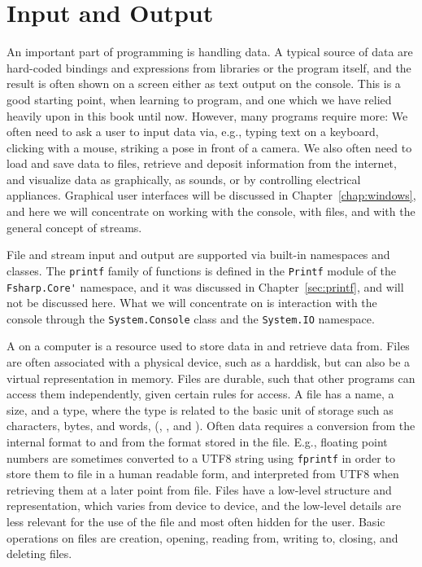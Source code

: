 \chapter{Input and Output}
\label{chap:IO}
An important part of programming is handling data. A typical source of data are hard-coded bindings and expressions from libraries or the program itself, and the result is often shown on a screen either as text output on the console. This is a good starting point, when learning to program, and one which we have relied heavily upon in this book until now. However, many programs require more: We often need to ask a user to input data via, e.g., typing text on a keyboard, clicking with a mouse, striking a pose in front of a camera. We also often need to load and save data to files, retrieve and deposit information from the internet, and visualize data as graphically, as sounds, or by controlling electrical appliances. Graphical user interfaces will be discussed in Chapter~\ref{chap:windows}, and here we will concentrate on working with the console, with files, and with the general concept of streams. 

File and stream input and output are supported via built-in namespaces and classes. The \lstinline!printf! family of functions is defined in the \lstinline!Printf! module of the \lstinline!Fsharp.Core'! namespace, and it was discussed in Chapter~\ref{sec:printf}, and will not be discussed here. What we will concentrate on is interaction with the console through the \lstinline!System.Console! class and the \lstinline!System.IO! namespace.

A  on a computer is a resource used to store data in and retrieve data from. Files are often associated with a physical device, such as a harddisk, but can also be a virtual representation in memory. Files are durable, such that other programs can access them independently, given certain rules for access. A file has a name, a size, and a type, where the type is related to the basic unit of storage such as characters, bytes, and words, (, , and ). Often data requires a conversion from the internal format to and from the format stored in the file. E.g., floating point numbers are sometimes converted to a UTF8 string using \lstinline!fprintf! in order to store them to file in a human readable form, and interpreted from UTF8 when retrieving them at a later point from file. Files have a low-level structure and representation, which varies from device to device, and the low-level details are less relevant for the use of the file and most often hidden for the user. Basic operations on files are creation, opening, reading from, writing to, closing, and deleting files.

